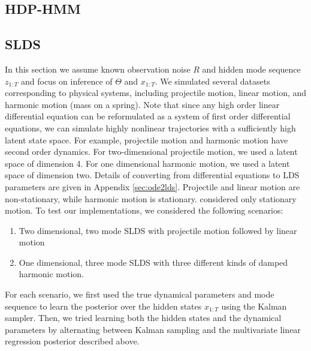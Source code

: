 \documentclass{article} %
\begin{document}
\subsection{HDP-HMM}

\subsection{SLDS}

In this section we assume known observation noise $R$ and hidden mode sequence $z_{1:T}$ and focus on inference of $\Theta$ and $x_{1:T}$. We simulated several datasets corresponding to physical systems, including projectile motion, linear motion, and harmonic motion (mass on a spring). Note that since any high order linear differential equation can be reformulated as a system of first order differential equations, we can simulate highly nonlinear trajectories with a sufficiently high latent state space. For example, projectile motion and harmonic motion have second order dynamics. For two-dimensional projectile motion, we used a latent space of dimension 4. For one dimensional harmonic motion, we used a latent space of dimension two. Details of converting from differential equations to LDS parameters are given in Appendix \ref{sec:ode2lds}. Projectile and linear motion are non-stationary, while harmonic motion is stationary. \cite{fox_bayesian_2009} considered only stationary motion. To test our implementations, we considered the following scenarios:

\begin{enumerate}
\item Two dimensional, two mode SLDS with projectile motion followed by linear motion
\item One dimensional, three mode SLDS with three different kinds of damped harmonic motion.
\end{enumerate}

For each scenario, we first used the true dynamical parameters and mode sequence to learn the posterior over the hidden states $x_{1:T}$ using the Kalman sampler. Then, we tried learning both the hidden states and the dynamical parameters by alternating between Kalman sampling and the multivariate linear regression posterior described above.
\end{document}
